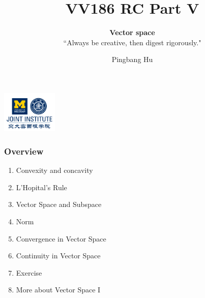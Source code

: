 \documentclass[12pt, t]{beamer}
\title{VV186 RC Part V}
\subtitle{\textbf{Vector space}\\``Always be creative, then digest rigorously."}
\institute[UM-SJTU JI]{University of Michigan-Shanghai Jiao Tong University Joint Institute}
\author{Pingbang Hu}
\begin{document}
\begin{frame}
    \titlepage
    \begin{center}
        \includegraphics[height=2cm]{Figures/logo/logo2.png}
    \end{center}
\end{frame}

\begin{frame}
    \frametitle{Overview}
    \begin{enumerate}
        \item Convexity and concavity
        \item L'Hopital's Rule
        \item Vector Space and Subspace
        \item Norm
        \item Convergence in Vector Space
        \item Continuity in Vector Space
        \item Exercise
        \item More about Vector Space I
    \end{enumerate}
\end{frame}
\end{document}
